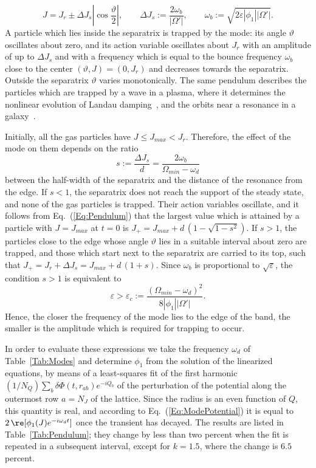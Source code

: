 \begin{equation}
J = J_r\pm \Delta J_s\left| \cos\frac{\vartheta}{2} \right|,\qquad
\Delta J_s := \frac{2\omega_b}{|\Omega'|},\qquad
\omega_b := \sqrt{2\varepsilon |\phi_1| |\Omega'|}.
\label{Eq:Separatrix}
\end{equation}
A particle which lies inside the separatrix is trapped by the mode: its angle $\vartheta$ oscillates about zero, and its action variable oscillates about $J_r$ with an amplitude of up to $\Delta J_s$ and with a frequency which is equal to the bounce frequency $\omega_b$ close to the center $(\vartheta,J) = (0,J_r)$ and decreases towards the separatrix. Outside the separatrix $\vartheta$ varies monotonically. The same pendulum describes the particles which are trapped by a wave in a plasma, where it determines the nonlinear evolution of Landau damping~\cite{tO65}, and the orbits near a resonance in a galaxy~\cite{BinneyTremaine-Book}.

Initially, all the gas particles have $J\leq J_{max} < J_r$. Therefore, the effect of the mode on them depends on the ratio
\begin{equation}
s := \frac{\Delta J_s}{d} = \frac{2\omega_b}{\Omega_{min} - \omega_d}
\label{Eq:sDef}
\end{equation}
between the half-width of the separatrix and the distance of the resonance from the edge. If $s < 1$, the separatrix does not reach the support of the steady state, and none of the gas particles is trapped. Their action variables oscillate, and it follows from Eq.~(\ref{Eq:Pendulum}) that the largest value which is attained by a particle with $J = J_{max}$ at $t = 0$ is $J_+ = J_{max} + d\,( 1 - \sqrt{1 - s^2} )$. If $s > 1$, the particles close to the edge whose angle $\vartheta$ lies in a suitable interval about zero are trapped, and those which start next to the separatrix are carried to its top, such that $J_+ = J_r + \Delta J_s = J_{max} + d\,(1 + s)$. Since $\omega_b$ is proportional to $\sqrt{\varepsilon}$, the condition $s > 1$ is equivalent to
\begin{equation}
\varepsilon > \varepsilon_c := \frac{(\Omega_{min} - \omega_d)^2}{8 |\phi_1| |\Omega'|}.
\label{Eq:epsc}
\end{equation}
Hence, the closer the frequency of the mode lies to the edge of the band, the smaller is the amplitude which is required for trapping to occur.

In order to evaluate these expressions we take the frequency $\omega_d$ of Table~\ref{Tab:Modes} and determine $\phi_1$ from the solution of the linearized equations, by means of a least-squares fit of the first harmonic $(1/N_Q)\sum_b \delta\Phi(t,r_{ab}) e^{-iQ_b}$ of the perturbation of the potential along the outermost row $a = N_J$ of the lattice. Since the radius is an even function of $Q$, this quantity is real, and according to Eq.~(\ref{Eq:ModePotential}) it is equal to $2\,\re[\phi_1(J) e^{-i\omega_d t}]$ once the transient has decayed. The results are listed in Table~\ref{Tab:Pendulum}; they change by less than two percent when the fit is repeated in a subsequent interval, except for $k = 1.5$, where the change is $6.5$ percent.

